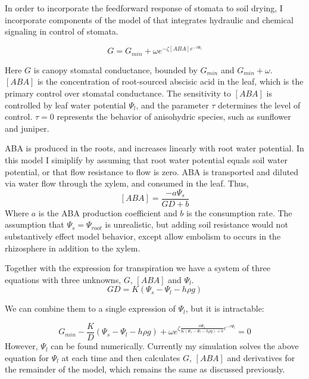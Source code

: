 \documentclass[12pt]{amsart}
\begin{document}
In order to incorporate the feedforward response of stomata to soil drying, I incorporate components of the model of \citet{Tardieu1993a} that integrates hydraulic and chemical signaling in control of stomata. 

\begin{equation}\label{Tardieu1}
G = G_{min} + \omega e^{-\zeta [ABA] e^{-\tau \Psi_l}}
\end{equation}

Here $G$ is canopy stomatal conductance, bounded by $G_{min}$ and $G_{min} + \omega$.  $[ABA]$ is the concentration of root-sourced abscisic acid in the leaf, which is the primary control over stomatal conductance.  The sensitivity to $[ABA]$ is controlled by leaf water potential $\Psi_l$, and the parameter $\tau$ determines the level of control.   $\tau = 0$ represents the behavior of anisohydric species, such as sunflower and juniper.

ABA is produced in the roots, and increases linearly with root water potential.  In this model I simiplify by assuming that root water potential equals soil water potential, or that flow resistance to flow is zero.  ABA is transported and diluted via water flow through the xylem, and consumed in the leaf.  Thus,
\begin{equation}\label{Tardieu2}
[ABA] = \frac{-a \Psi_s}{GD + b}
\end{equation}
Where $a$ is the ABA production coefficient and $b$ is the consumption rate.  The assumption that $\Psi_s = \Psi_{root}$ is unrealistic, but adding soil resistance would not substantively effect model behavior, except allow embolism to occurs in the rhizosphere in addition to the xylem.

Together with the expression for transpiration we have a system of three equations with three unknowns, $G$, $[ABA]$ and $\Psi_l$.
\begin{equation}\label{GD}
GD = K(\Psi_s - \Psi_l - h\rho g)
\end{equation}

We can combine them to a single expression of $\Psi_l$, but it is intractable:

\begin{equation}\label{pain}
G_{min} - \frac{K}{D}(\Psi_s - \Psi_l - h \rho g) + \omega e^{\zeta \frac{a \Psi_s}{K(\Psi_s - \Psi_l - h \rho g) + b} e^{- \tau \Psi_l}} = 0
\end{equation}
However, $\Psi_l$ can be found numerically.   Currently my simulation solves the above equation for $\Psi_l$ at each time and then calculates $G$, $[ABA]$ and derivatives for the remainder of the model, which remains the same as discussed previously.
\end{document}
